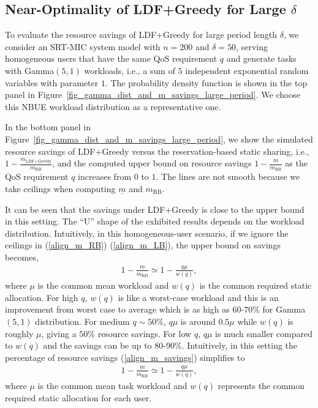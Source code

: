 \documentclass[prodmode,acmtompecs]{acmsmall}
\newcommand{\reqscalar}{q}
\newcommand{\myComments}[1]{}
\newif\ifdissertation
\newcommand{\dissertationStart}{\ifdissertation  \myComments{Dissertation version: }}
\newcommand{\commentEnd}{\myComments{End}}
\begin{document}
\subsection{Near-Optimality of LDF+Greedy for Large $\delta$}
\dissertationStart
LDF+Greedy is simple to implement in practice since it does not require knowledge of workload distribution or the task preemption and migration. 
\commentEnd\fi
To evaluate the resource savings of LDF+Greedy for large period length $\delta$, we consider an SRT-MIC system model with $n=200$ and $\delta=50$, serving homogeneous users that have the same QoS requirement $\reqscalar$ and generate tasks with Gamma$(5,1)$ workloads, i.e., a sum of $5$ independent exponential random variables with parameter $1$. 
The probability density function is shown in the top panel in Figure~{\ref{fig_gamma_dist_and_m_savings_large_period}}. We choose this NBUE workload distribution as a representative one. 

In the bottom panel in Figure~{\ref{fig_gamma_dist_and_m_savings_large_period}}, 
we show the simulated resource savings of LDF+Greedy versus the reservation-based static sharing, i.e., $1 - \frac{m_{\text{LDF+Greedy}}}{m_{\text{RB}}}$, and the computed upper bound on resource savings $1 - \frac{\underline{m}}{m_{\text{RB}}}$ as the QoS requirement $\reqscalar$ increases from $0$ to $1$. 
The lines are not smooth because we take ceilings when computing $\underline{m}$ and $m_{\text{RB}}$. 

It can be seen that the savings under LDF+Greedy is close to the upper bound in this setting. 
The ``U'' shape of the exhibited results depends on the workload distribution. 
Intuitively, in this homogeneous-user scenario, if we ignore the ceilings in (\ref{align_m_RB}) (\ref{align_m_LB}), the upper bound on savings becomes,
\begin{align}
\label{align_m_savings_simplified}
1 - \frac{\underline{m}}{m_{\text{RB}}} \simeq 1 - \frac{q \mu}{w(q)}, 
\end{align}
where $\mu$ is the common mean workload and $w(q)$ is the common required static allocation. 
For high $\reqscalar$, $w(q)$ is like a worst-case workload and this is an improvement from worst case to average which is as high as $60$-$70\%$ for Gamma$(5,1)$ distribution. 
For medium $\reqscalar\sim50\%$, $\reqscalar\mu$ is around $0.5\mu$ while $w(q)$ is roughly $\mu$, giving a $50\%$ resource savings. For low $\reqscalar$, $\reqscalar\mu$ is much smaller compared to $w(q)$ and the savings can be up to $80$-$90\%$. 
\dissertationStart
Intuitively, in this setting the percentage of resource savings (\ref{align_m_savings}) simplifies to
\begin{align}
\label{align_m_savings_simplified}
1 - \frac{\underline{m}}{m_{\text{RB}}} \simeq 1 - \frac{q \mu}{w(q)}, 
\end{align}
where $\mu$ is the common mean task workload and $w(q)$ represents the common required static allocation for each user. 
\end{document}
